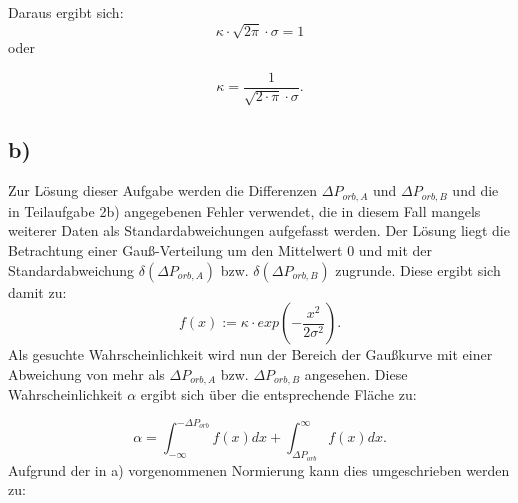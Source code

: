 \documentclass[titlepage]{scrartcl}
\begin{document}
Daraus ergibt sich: 
\begin{equation}
\kappa \cdot \sqrt{2\pi} \cdot \sigma = 1
\end{equation} oder


\begin{equation}
\kappa = \frac{1}{\sqrt{2\cdot \pi} \cdot \sigma}.
\label{eq_1}
\end{equation}



\subsection{b)}
Zur Lösung dieser Aufgabe werden die Differenzen $\Delta P_{orb,A}$ und $\Delta P_{orb,B}$ und die in Teilaufgabe 2b) angegebenen Fehler verwendet, die in diesem Fall mangels weiterer Daten als Standardabweichungen aufgefasst werden.
Der Lösung liegt die Betrachtung einer Gauß-Verteilung um den Mittelwert 0 und mit der Standardabweichung $\delta (\Delta P_{orb,A})$ bzw. $\delta (\Delta P_{orb,B})$ zugrunde. 
Diese ergibt sich damit zu:
\begin{equation}
f(x) := \kappa \cdot exp(-\frac{x^2}{2\sigma^2}). 
\end{equation} 
Als gesuchte Wahrscheinlichkeit wird nun der Bereich der Gaußkurve mit einer Abweichung von mehr als $\Delta P_{orb,A}$ bzw. $\Delta P_{orb,B}$ angesehen. Diese Wahrscheinlichkeit $\alpha$ ergibt sich über die entsprechende Fläche zu: 

\begin{equation}
\alpha = \int_{-\infty} ^{-\Delta P_{orb}} f(x) dx + \int_{\Delta P_{orb}} ^{\infty} f(x) dx.
\end{equation}
Aufgrund der in a) vorgenommenen Normierung kann dies umgeschrieben werden zu: 
\end{document}
